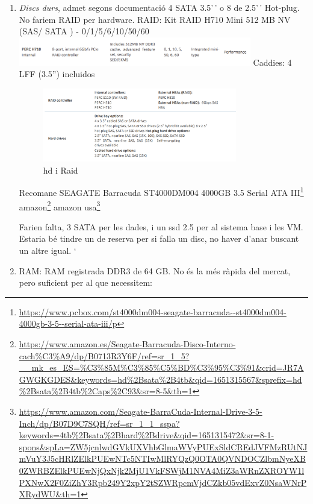 \documentclass[
  10pt,
]{krantz}
\DeclareRobustCommand{\href}[2]{#2\footnote{\url{#1}}}
\begin{document}
\begin{enumerate}
\def\labelenumi{\arabic{enumi}.}
\item
  \emph{Discs durs}, admet segons documentació 4 SATA 3.5'\,' o 8 de 2.5'\,' Hot-plug. No fariem RAID per hardware. RAID: Kit RAID H710 Mini 512 MB NV (SAS/ SATA ) - 0/1/5/6/10/50/60 \includegraphics[width=0.8\textwidth,height=\textheight]{imatges/ser_h710.png} Caddies: 4 LFF (3.5'') incluidos

  \begin{figure}
  \centering
  \includegraphics[width=0.8\textwidth,height=\textheight]{imatges/ser_hd.png}
  \caption{hd i Raid}
  \end{figure}

  Recomane \href{https://www.pcbox.com/st4000dm004-seagate-barracuda--st4000dm004-4000gb-3-5--serial-ata-iii/p}{SEAGATE Barracuda ST4000DM004 4000GB 3.5 Serial ATA III} \href{https://www.amazon.es/Seagate-Barracuda-Disco-Interno-cach\%C3\%A9/dp/B0713R3Y6F/ref=sr_1_5?__mk_es_ES=\%C3\%85M\%C3\%85\%C5\%BD\%C3\%95\%C3\%91\&crid=JR7AGWGKGDES\&keywords=hd\%2Bsata\%2B4tb\&qid=1651315567\&sprefix=hd\%2Bsata\%2B4tb\%2Caps\%2C93\&sr=8-5\&th=1}{amazon} \href{https://www.amazon.com/Seagate-BarraCuda-Internal-Drive-3-5-Inch/dp/B07D9C7SQH/ref=sr_1_1_sspa?keywords=4tb\%2Bsata\%2Bhard\%2Bdrive\&qid=1651315472\&sr=8-1-spons\&spLa=ZW5jcnlwdGVkUXVhbGlmaWVyPUExSldCREdJVFMzRUtNJmVuY3J5cHRlZElkPUEwNTc5NTIwMlRYQzQ0OTA0QVNDOCZlbmNyeXB0ZWRBZElkPUEwNjQxNjk2MjU1VkFSWjM1NVA4MiZ3aWRnZXROYW1lPXNwX2F0ZiZhY3Rpb249Y2xpY2tSZWRpcmVjdCZkb05vdExvZ0NsaWNrPXRydWU\&th=1}{amazon usa}

  Farien falta, 3 SATA per les dades, i un ssd 2.5 per al sistema base i les VM. Estaria bé tindre un de reserva per si falla un disc, no haver d'anar buscant un altre igual. `
\item
  RAM: RAM registrada DDR3 de 64 GB. No és la més ràpida del mercat, pero suficient per al que necessitem:


\end{enumerate}
\end{document}
